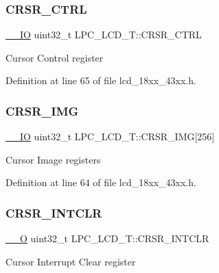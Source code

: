 \subsubsection{\texorpdfstring{C\+R\+S\+R\+\_\+\+C\+T\+RL}{CRSR\_CTRL}}
{\footnotesize\ttfamily \hyperlink{core__sc300_8h_aec43007d9998a0a0e01faede4133d6be}{\+\_\+\+\_\+\+IO} uint32\+\_\+t L\+P\+C\+\_\+\+L\+C\+D\+\_\+\+T\+::\+C\+R\+S\+R\+\_\+\+C\+T\+RL}

Cursor Control register 

Definition at line 65 of file lcd\+\_\+18xx\+\_\+43xx.\+h.

\mbox{\label{struct_l_p_c___l_c_d___t_a613e7a12e496f28aa4d67f8d0caf8363}} 
\subsubsection{\texorpdfstring{C\+R\+S\+R\+\_\+\+I\+MG}{CRSR\_IMG}}
{\footnotesize\ttfamily \hyperlink{core__sc300_8h_aec43007d9998a0a0e01faede4133d6be}{\+\_\+\+\_\+\+IO} uint32\+\_\+t L\+P\+C\+\_\+\+L\+C\+D\+\_\+\+T\+::\+C\+R\+S\+R\+\_\+\+I\+MG\mbox{[}256\mbox{]}}

Cursor Image registers 

Definition at line 64 of file lcd\+\_\+18xx\+\_\+43xx.\+h.

\mbox{\label{struct_l_p_c___l_c_d___t_abfa32c24adcbaa602ae75ef51a360091}} 
\subsubsection{\texorpdfstring{C\+R\+S\+R\+\_\+\+I\+N\+T\+C\+LR}{CRSR\_INTCLR}}
{\footnotesize\ttfamily \hyperlink{core__sc300_8h_a7e25d9380f9ef903923964322e71f2f6}{\+\_\+\+\_\+O} uint32\+\_\+t L\+P\+C\+\_\+\+L\+C\+D\+\_\+\+T\+::\+C\+R\+S\+R\+\_\+\+I\+N\+T\+C\+LR}

Cursor Interrupt Clear register 

